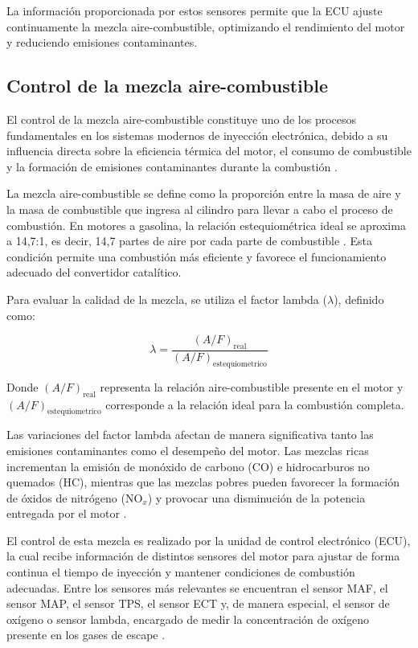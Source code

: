 La información proporcionada por estos sensores permite que la ECU ajuste continuamente la mezcla aire-combustible, optimizando el rendimiento del motor y reduciendo emisiones contaminantes.


\subsection{Control de la mezcla aire-combustible}

El control de la mezcla aire-combustible constituye uno de los procesos fundamentales en los sistemas modernos de inyección electrónica, debido a su influencia directa sobre la eficiencia térmica del motor, el consumo de combustible y la formación de emisiones contaminantes durante la combustión \citep{Fundamentos_Inyeccion, Bosch_GDI}.

La mezcla aire-combustible se define como la proporción entre la masa de aire y la masa de combustible que ingresa al cilindro para llevar a cabo el proceso de combustión. En motores a gasolina, la relación estequiométrica ideal se aproxima a 14,7:1, es decir, 14,7 partes de aire por cada parte de combustible \citep{Bosch_Automotive}. Esta condición permite una combustión más eficiente y favorece el funcionamiento adecuado del convertidor catalítico.

Para evaluar la calidad de la mezcla, se utiliza el factor lambda ($\lambda$), definido como:

\begin{equation}
	\lambda = \frac{(A/F)_{\mathrm{real}}}{(A/F)_{\mathrm{estequiometrico}}}
	\label{eq:lambda}
\end{equation}

Donde $(A/F)_{\mathrm{real}}$ representa la relación aire-combustible presente en el motor y $(A/F)_{\mathrm{estequiometrico}}$ corresponde a la relación ideal para la combustión completa.

Las variaciones del factor lambda afectan de manera significativa tanto las emisiones contaminantes como el desempeño del motor. Las mezclas ricas incrementan la emisión de monóxido de carbono (CO) e hidrocarburos no quemados (HC), mientras que las mezclas pobres pueden favorecer la formación de óxidos de nitrógeno (NO$_x$) y provocar una disminución de la potencia entregada por el motor \citep{Combustion_Emissions_2020}.

El control de esta mezcla es realizado por la unidad de control electrónico (ECU), la cual recibe información de distintos sensores del motor para ajustar de forma continua el tiempo de inyección y mantener condiciones de combustión adecuadas. Entre los sensores más relevantes se encuentran el sensor MAF, el sensor MAP, el sensor TPS, el sensor ECT y, de manera especial, el sensor de oxígeno o sensor lambda, encargado de medir la concentración de oxígeno presente en los gases de escape \citep{Bosch_Automotive, Fundamentos_Inyeccion}.

